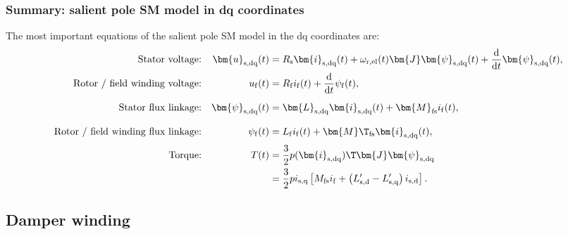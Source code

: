 \begin{frame}
	\frametitle{Summary: salient pole SM model in dq coordinates}
	The most important equations of the salient pole SM model in the  dq coordinates are:
	\begin{equation*}
		\begin{alignedat}{4}
			 &  & \mbox{Stator voltage:}                     &  & \quad\bm{u}_\mathrm{s,dq}(     & t) &  & = R_\mathrm{s} \bm{i}_\mathrm{s,dq}(t)+ \omega_\mathrm{r,el}(t)\bm{J}\bm{\psi}_\mathrm{s,dq}(t) + \frac{\mathrm{d}}{\mathrm{d}t}\bm{\psi}_\mathrm{s,dq}(t), \\
			 &  & \mbox{Rotor / field winding  voltage:}     &  & \quad u_\mathrm{f}(            & t) &  & = R_\mathrm{f}i_\mathrm{f}(t)+\frac{\mathrm{d}}{\mathrm{d}t}\psi_\mathrm{f}(t),                                                                             \\
			 &  & \mbox{Stator flux linkage:}                &  & \quad \bm{\psi}_\mathrm{s,dq}( & t) &  & = \bm{L}_\mathrm{s,dq}\bm{i}_{\mathrm{s,dq}}(t) + \bm{M}_\mathrm{fs} i_{\mathrm{f}}(t), \vphantom{\frac{\mathrm{d}}{\mathrm{d}t}}                           \\
			 &  & \mbox{Rotor / field winding flux linkage:} &  & \psi_\mathrm{f}(               & t) &  & = L_\mathrm{f} i_\mathrm{f}(t) + \bm{M}\T_\mathrm{fs} \bm{i}_\mathrm{s,dq}(t),\vphantom{\frac{\mathrm{d}}{\mathrm{d}t}}                                     \\
			 &  & \mbox{Torque:}                             &  & \quad T(                       & t) &  & = \frac{3}{2} p (\bm{i}_\mathrm{s,dq})\T\bm{J}\bm{\psi}_\mathrm{s,dq}                                                                                       \\
			 &  &                                            &  &                                &    &  & =\frac{3}{2} p i_\mathrm{s,q}\left[ M_\mathrm{fs} i_{\mathrm{f}} + \left(L'_\mathrm{s,d}-L'_\mathrm{s,q}\right)i_\mathrm{s,d}\right].
		\end{alignedat}
	\end{equation*}
\end{frame}

\subsection{Damper winding}

